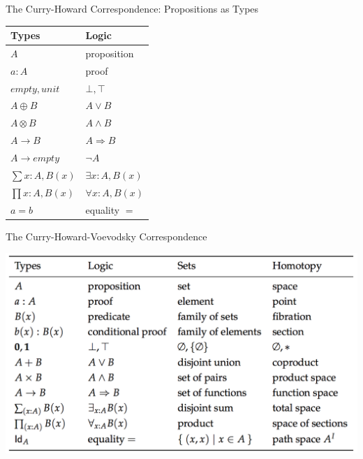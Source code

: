 \documentclass[pdf]{beamer}
\begin{document}
\begin{frame}{The Curry-Howard Correspondence: Propositions as Types}
  \begin{table}[]
    \begin{tabular}{ll}
      \hline
      \textbf{Types}     & \textbf{Logic}       \\ \hline
      $A$                & proposition          \\
      $a : A$            & proof                \\
      $empty, unit$      & $\bot, \top$         \\
      $A \oplus B$       & $A \lor B$           \\
      $A \otimes B$      & $A \land B$          \\
      $A \to B$          & $A \Rightarrow B$    \\
      $A \to empty$      & $\neg{A}$            \\
      $\sum{x:A}, B(x)$  & $\exists{x:A}, B(x)$ \\
      $\prod{x:A}, B(x)$ & $\forall{x:A}, B(x)$ \\
      $a=b$              & equality $=$         \\ \hline
    \end{tabular}
  \end{table}
\end{frame}

\begin{frame}{The Curry-Howard-Voevodsky Correspondence\footnotemark[4]}
  \begin{center}
    \includegraphics[scale=0.47]{images/hott}
  \end{center}
\end{frame}
\end{document}
